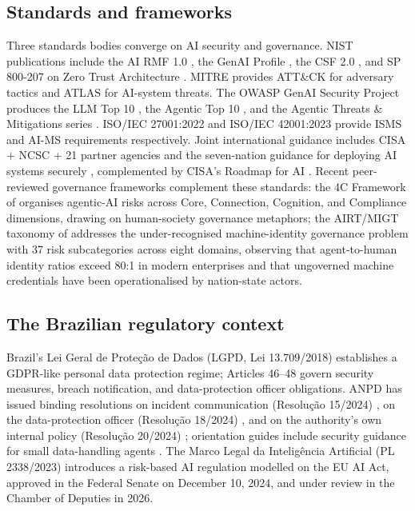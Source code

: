 \documentclass[preprint,12pt,authoryear]{elsarticle}
\begin{document}
\subsection{Standards and frameworks}
\label{ssec:standards}
Three standards bodies converge on AI security and governance. NIST publications include the AI RMF 1.0 \citep{nist2023airmf}, the GenAI Profile \citep{nist2024genai}, the CSF 2.0 \citep{nist2024csf}, and SP 800-207 on Zero Trust Architecture \citep{nist2020sp800207}. MITRE provides ATT\&CK \citep{mitre2024attck} for adversary tactics and ATLAS \citep{mitre2025atlas} for AI-system threats. The OWASP GenAI Security Project produces the LLM Top 10 \citep{owasp2025llm}, the Agentic Top 10 \citep{owasp2025agentic}, and the Agentic Threats \& Mitigations series \citep{owasp2025agenticthreats}. ISO/IEC 27001:2022 \citep{iso27001} and ISO/IEC 42001:2023 \citep{iso42001} provide ISMS and AI-MS requirements respectively. Joint international guidance includes CISA + NCSC + 21 partner agencies \citep{cisa2023ncsc} and the seven-nation guidance for deploying AI systems securely \citep{nsa2024deploying}, complemented by CISA's Roadmap for AI \citep{cisa_roadmap}. Recent peer-reviewed governance frameworks complement these standards: the 4C Framework of \citet{4c2026} organises agentic-AI risks across Core, Connection, Cognition, and Compliance dimensions, drawing on human-society governance metaphors; the AIRT/MIGT taxonomy of \citet{airt_migt2026} addresses the under-recognised machine-identity governance problem with 37 risk subcategories across eight domains, observing that agent-to-human identity ratios exceed 80:1 in modern enterprises and that ungoverned machine credentials have been operationalised by nation-state actors.

\subsection{The Brazilian regulatory context}
\label{ssec:lgpd}
Brazil's Lei Geral de Proteção de Dados (LGPD, Lei 13.709/2018) \citep{lgpd2018} establishes a GDPR-like personal data protection regime; Articles 46--48 govern security measures, breach notification, and data-protection officer obligations. ANPD has issued binding resolutions on incident communication (Resolução 15/2024) \citep{anpd15}, on the data-protection officer (Resolução 18/2024) \citep{anpd18}, and on the authority's own internal policy (Resolução 20/2024) \citep{anpd20}; orientation guides include security guidance for small data-handling agents \citep{anpd_pmeguia,anpd_guias}. The Marco Legal da Inteligência Artificial (PL 2338/2023) \citep{pl2338} introduces a risk-based AI regulation modelled on the EU AI Act, approved in the Federal Senate on December 10, 2024, and under review in the Chamber of Deputies in 2026.
\end{document}
